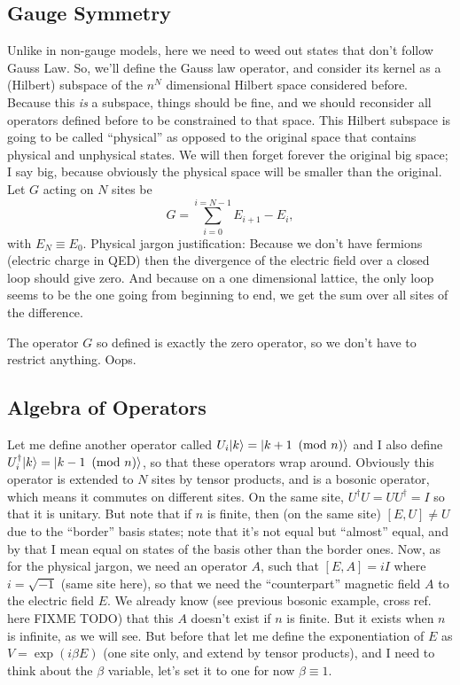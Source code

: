 	\subsection{Gauge Symmetry}
	Unlike in non-gauge models, here we need to weed out states that don't follow Gauss Law. So, we'll define the Gauss law operator, and
	consider its kernel as a (Hilbert) subspace of the $n^N$ dimensional Hilbert space considered before.
	Because this \emph{is} a subspace, things should be fine, and we should reconsider all operators defined before to be constrained to that space.
	This Hilbert subspace is going to be called ``physical'' as opposed to the original space that contains physical and unphysical states.
	We will then forget forever the original big space; I say big, because obviously the physical space will be smaller than the original.
	Let $G$ acting on $N$ sites be
	\begin{equation}
	G = \sum_{i=0}^{i=N-1} E_{i+1} - E_i,
	\end{equation}
	with $E_N\equiv E_0$.
	Physical jargon justification: Because we don't have fermions (electric charge in QED) then the divergence of the electric field
	over a closed loop should give zero. And because on a one dimensional lattice, the only loop seems to be the one going from beginning to end, we
	get the sum over all sites of the difference.

	The operator $G$ so defined is exactly the zero operator, so we don't have to restrict anything. Oops.

	\subsection{Algebra of Operators}
	Let me define another operator called $U_i|k\rangle=\ket{k+1 \ \left(\mathrm{mod}\ n\right)}$ and I also define $U^\dagger_i|k\rangle=\ket{k - 1 \ \left(\mathrm{mod}\ n\right)}$, so
	that these operators wrap around. Obviously this operator is extended to $N$ sites by tensor products, and is a bosonic operator,
	which means it commutes on different sites. On the same site, $U^\dagger U = U U^\dagger = I$ so that it is unitary.
	But note that if $n$ is finite, then (on the same site) $[E, U]\neq U$ due to the ``border'' basis states;
	note that it's not equal but ``almost'' equal, and by that I mean equal on states of the basis other than the border ones.
	Now, as for the physical jargon, we need an operator $A$, such that $[E, A] = iI$ where $i=\sqrt{-1}$ (same site here),
	 so that we need the ``counterpart'' magnetic field $A$
	to the electric field $E$. We already know (see previous bosonic example, cross ref. here FIXME TODO) that this $A$ doesn't
	exist if $n$ is finite. But it exists when $n$ is infinite, as we will see.
	But before that let me define the exponentiation of $E$ as $V=\exp(i \beta E)$ (one site only, and extend by tensor products), and
	I need to think about the $\beta$ variable, let's set it to one for now $\beta\equiv 1$.

